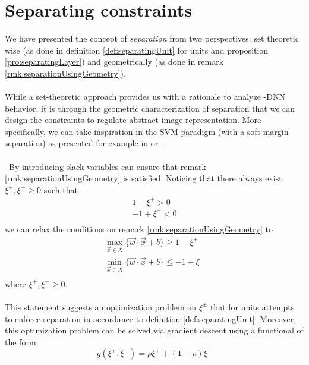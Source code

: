 \section{Separating constraints}\label{sec:constraint}
We have presented the concept of \emph{separation} from two perspectives: set theoretic wise (as done in definition \ref{def:separatingUnit} for units and proposition \ref{pro:separatingLayer}) and geometrically (as done in remark \ref{rmk:separationUsingGeometry}). 
\\\\
While a set-theoretic approach provides us with a rationale to analyze \ReLU-DNN behavior, it is through the geometric characterization of separation that we can design the constraints to regulate abstract image representation. More specifically, we can take inspiration in the SVM paradigm (with a soft-margin separation) as presented for example in  \cite{Burges1998TutorialOnSVMForPatternRecognition} or \cite{Hearst1998SupportVectorMachines}. 
\\\\\
By introducing  slack variables can ensure that remark \ref{rmk:separationUsingGeometry} is satisfied. Noticing that there always exist  $\xi^{+},\xi^{-}\geq 0$ such that 
\begin{equation}
\begin{array}{c}
    1-\xi^{+} > 0 \\ -1+\xi^{-}<0\\
\end{array}
\end{equation}
we can relax the conditions on remark \ref{rmk:separationUsingGeometry} to
\begin{equation}\label{eq:basicConstraintFormulation}
\begin{array}{l}
    \displaystyle\max_{\vec{x}\in X}\{\vec{w}\cdot\vec{x}+b\}\geq 1-\xi^{+}\\
    \displaystyle\min_{\vec{x}\in X}\{\vec{w}\cdot\vec{x}+b\}\leq -1+\xi^{-}\\
\end{array}
\end{equation}
where $\xi^{+},\xi^{-}\geq 0$.
\\\\
This statement suggests an optimization problem on $\xi^{\pm}$ that for units attempts to enforce separation in accordance to definition \ref{def:separatingUnit}. Moreover, this optimization problem can be solved via gradient descent using a functional of the form
\begin{equation}\label{eq:definitionOfRho}
    g(\xi^{+},\xi^{-}) = \rho\xi^{+}+(1-\rho)\xi^{-}
\end{equation}
